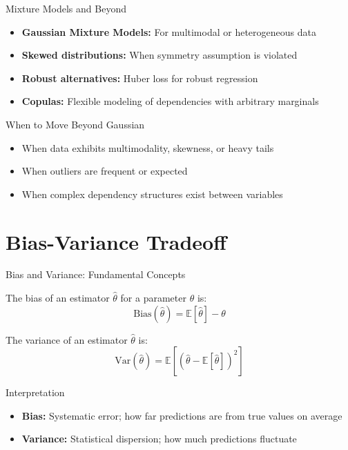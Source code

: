 \documentclass{beamer}
\begin{document}
\begin{frame}{Mixture Models and Beyond}
  \begin{itemize}
    \item \textbf{Gaussian Mixture Models:} For multimodal or heterogeneous data
    \item \textbf{Skewed distributions:} When symmetry assumption is violated
    \item \textbf{Robust alternatives:} Huber loss for robust regression
    \item \textbf{Copulas:} Flexible modeling of dependencies with arbitrary marginals
  \end{itemize}
  
  \begin{block}{When to Move Beyond Gaussian}
    \begin{itemize}
      \item When data exhibits multimodality, skewness, or heavy tails
      \item When outliers are frequent or expected
      \item When complex dependency structures exist between variables
    \end{itemize}
  \end{block}
\end{frame}

\section{Bias-Variance Tradeoff}

\begin{frame}{Bias and Variance: Fundamental Concepts}
  \begin{definition}[Bias]
    The bias of an estimator $\hat{\theta}$ for a parameter $\theta$ is:
    \[
    \text{Bias}(\hat{\theta}) = \mathbb{E}[\hat{\theta}] - \theta
    \]
  \end{definition}
  
  \begin{definition}[Variance]
    The variance of an estimator $\hat{\theta}$ is:
    \[
    \text{Var}(\hat{\theta}) = \mathbb{E}[(\hat{\theta} - \mathbb{E}[\hat{\theta}])^2]
    \]
  \end{definition}
  
  \begin{block}{Interpretation}
    \begin{itemize}
      \item \textbf{Bias:} Systematic error; how far predictions are from true values on average
      \item \textbf{Variance:} Statistical dispersion; how much predictions fluctuate
    \end{itemize}
  \end{block}
\end{frame}
\end{document}
